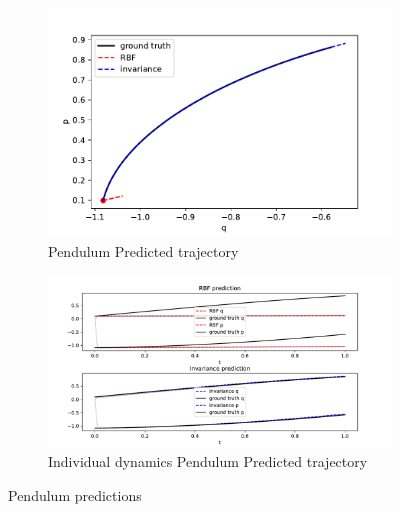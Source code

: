 \documentclass{statsmsc}
\begin{document}
\begin{figure}[H]
     \centering
     \begin{subfigure}[b]{\linewidth}
        \centering
        \includegraphics[width=\linewidth]{../codes/figures/pendulum_predicted_trajectory.pdf}
        \caption{Pendulum Predicted trajectory}
        \label{fig:pendulum_prediction_combined}
     \end{subfigure}
     \hfill
     \begin{subfigure}[b]{\linewidth}
         \centering
         \includegraphics[width=\linewidth]{../codes/figures/pendulum_predicted_trajectory_seperate.pdf}
         \caption{Individual dynamics Pendulum Predicted trajectory}
         \label{fig:pendulum_prediction_seperate}
     \end{subfigure}
        \caption{Pendulum predictions}
        \label{fig:pendulum_prediction}
\end{figure}
\end{document}

